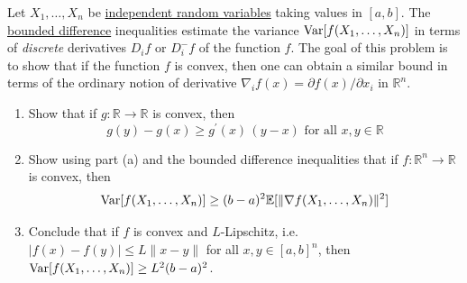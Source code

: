   \begin{exercise}
  Let $X_1, \ldots, X_n$ be \hyperref[prob-def:independent-random-variables]{independent random variables} taking values in $[a, b]$. The \hyperref[prob-thm:bounded-difference-inequality]{bounded difference} inequalities estimate the variance $\operatorname{Var}[f(X_1, \ldots, X_n)]$ in terms of \textit{discrete} derivatives $D_i f$ or $D_i^- f$ of the function $f$. The goal of this problem is to show that if the function $f$ is convex, then one can obtain a similar bound in terms of the ordinary notion of derivative $\nabla_i f(x) = \partial f(x)/\partial x_i$ in $\mathbb{R}^n$. 
  \begin{enumerate}
      \item Show that if $g: \mathbb{R} \to \mathbb{R}$ is convex, then 
      \begin{equation}
        g(y) - g(x) \geq g^\prime (x)\, (y - x) \text{ for all } x, y \in \mathbb{R}
      \end{equation}
      
      \item Show using part (a) and the bounded difference inequalities that if $f: \mathbb{R}^n \rightarrow \mathbb{R}$ is convex, then 
      \begin{equation}
        \operatorname{Var}[f(X_1, \ldots, X_n)] \geq (b - a)^2 \mathbb{E}[ \|\nabla f (X_1, \ldots, X_n)\|^2]
      \end{equation}
      
      \item Conclude that if $f$ is convex and $L$-Lipschitz, i.e. $|f(x) - f(y)| \leq L \|x - y\|$ for all $x, y \in [a, b]^n$, then $\operatorname{Var}[f(X_1, \ldots, X_n)] \geq L^2 (b - a)^2$. 
  \end{enumerate}
  \end{exercise}
